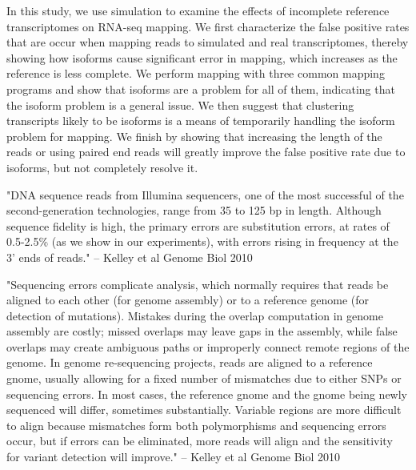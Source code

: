 \documentclass[10pt]{article}
\begin{document}
In this study, we use simulation to examine the effects of incomplete reference transcriptomes on RNA-seq mapping.  We first characterize the false positive rates that are occur when mapping reads to simulated and real transcriptomes, thereby showing how isoforms cause significant error in mapping, which increases as the reference is less complete.  We perform mapping with three common mapping programs and show that isoforms are a problem for all of them, indicating that the isoform problem is a general issue.  We then suggest that clustering transcripts likely to be isoforms is a means of temporarily handling the isoform problem for mapping.  We finish by showing that increasing the length of the reads or using paired end reads will greatly improve the false positive rate due to isoforms, but not completely resolve it.



"DNA sequence reads from Illumina sequencers, one of the most successful of the second-generation technologies, range from 35 to 125 bp in length.  Although sequence fidelity is high, the primary errors are substitution errors, at rates of 0.5-2.5\% (as we show in our experiments), with errors rising in frequency at the 3' ends of reads." -- Kelley et al Genome Biol 2010

"Sequencing errors complicate analysis, which normally requires that reads be aligned to each other (for genome assembly) or to a reference genome (for detection of mutations).  Mistakes during the overlap computation in genome assembly are costly; missed overlaps may leave gaps in the assembly, while false overlaps may create ambiguous paths or improperly connect remote regions of the genome.  In genome re-sequencing projects, reads are aligned to a reference gnome, usually allowing for a fixed number of mismatches due to either SNPs or sequencing errors.  In most cases, the reference gnome and the gnome being newly sequenced will differ, sometimes substantially.  Variable regions are more difficult to align because mismatches form both polymorphisms and sequencing errors occur, but if errors can be eliminated, more reads will align and the sensitivity for variant detection will improve." -- Kelley et al Genome Biol 2010
\end{document}
